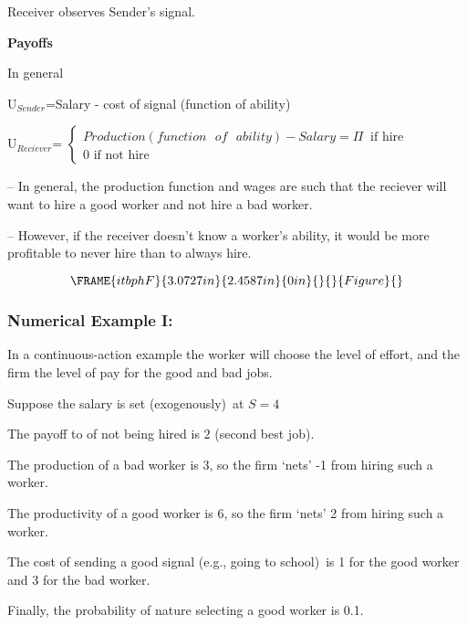 \documentclass{article}
\begin{document}
Receiver observes Sender's signal.\bigskip

\textbf{Payoffs}

In general

U$_{Sender}$=Salary - cost of signal (function of ability)

U$_{Reciever}$= $\left\{ 
\begin{array}{c}
Production(function\text{ }of\text{ }ability)-Salary=\Pi \ \text{\ if hire}
\\ 
0\text{ if not hire}%
\end{array}%
\right. $

-- In general, the production function and wages are such that the reciever
will want to hire a good worker and not hire a bad worker.

-- However, if the receiver doesn't know a worker's ability, it would be
more profitable to never hire than to always hire.\bigskip

\begin{equation}
\FRAME{itbphF}{3.0727in}{2.4587in}{0in}{}{}{Figure}{\special{language
"Scientific Word";type "GRAPHIC";maintain-aspect-ratio TRUE;display
"USEDEF";valid_file "T";width 3.0727in;height 2.4587in;depth
0in;original-width 7.3172in;original-height 4.9078in;cropleft "0";croptop
"1";cropright "1";cropbottom "0";tempfilename
'JSY1S00G.wmf';tempfile-properties "XPR";}}
\end{equation}

\subsubsection{Numerical Example I:}

In a continuous-action example the worker will choose the level of effort,
and the firm the level of pay for the good and bad jobs.\bigskip\ \ 

Suppose the salary is set (exogenously)\ at $S=4$

The payoff to of not being hired is $2$ (second best job).

The production of a bad worker is $3$, so the firm `nets' -1 from hiring
such a worker.

The productivity of a good worker is $6$, so the firm `nets' 2 from hiring
such a worker.

The cost of sending a good signal (e.g., going to school)\ is 1 for the good
worker and 3 for the bad worker.

\bigskip

Finally, the probability of nature selecting a good worker is 0.1. \ 
\end{document}
